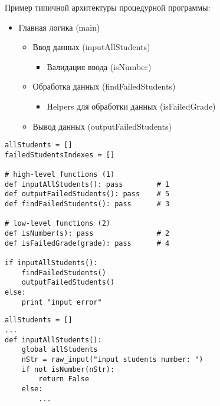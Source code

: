 {{      Пример типичной архитектуры процедурной программы:
      \vspace{0.5cm}
      \begin{itemize}
        \item Главная логика (main)
          \begin{itemize}
            \item Ввод данных (inputAllStudents)
              \begin{itemize}
                \item Валидация ввода (isNumber)
              \end{itemize}
            \item Обработка данных (findFailedStudents)
              \begin{itemize}
                \item Helpers для обработки данных (isFailedGrade)
              \end{itemize}
            \item Вывод данных (outputFailedStudents)
          \end{itemize}
      \end{itemize}
    }


\begin{frame}[fragile]
  \begin{verbatim}
allStudents = []
failedStudentsIndexes = []

# high-level functions (1)
def inputAllStudents(): pass        # 1
def outputFailedStudents(): pass    # 5
def findFailedStudents(): pass      # 3

# low-level functions (2)
def isNumber(s): pass               # 2
def isFailedGrade(grade): pass      # 4

if inputAllStudents():
    findFailedStudents()
    outputFailedStudents()
else:
    print "input error"
  \end{verbatim}
\end{frame}

\begin{frame}[fragile]
  \begin{verbatim}
allStudents = []
...
def inputAllStudents():
    global allStudents
    nStr = raw_input("input students number: ")
    if not isNumber(nStr):
        return False
    else:
        ...
  \end{verbatim}
\end{frame}

}
